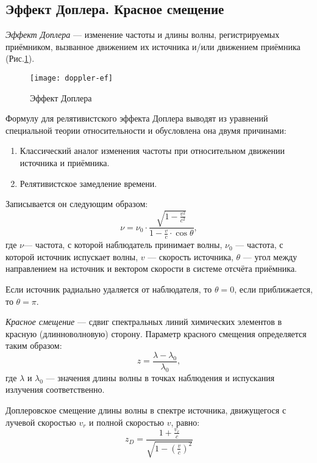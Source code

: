 \subsection{Эффект Доплера. Красное смещение} 
\textit{Эффект Доплера} --- изменение частоты и длины волны, регистрируемых  приёмником, вызванное движением их источника и/или движением приёмника (Рис.\ref{doppler-ef}).

\begin{figure}[h!]
\begin{center}
\texttt{[image: doppler-ef]}
\caption{Эффект Доплера}\label{doppler-ef}
\end{center}
\end{figure}

Формулу для релятивистского эффекта Доплера выводят из уравнений  специальной теории относительности и обусловлена она двумя причинами:
\begin{enumerate}
\item Классический аналог изменения частоты при относительном движении источника и приёмника.
\item Релятивистское замедление времени.
\end{enumerate}

Записывается он следующим образом:
\begin{equation}
\nu=\nu_0\cdot\frac{\sqrt{1-\frac{v^2}{c^2}}}{1-\frac{v}{c}\cdot\cos\theta},
\end{equation}
где $\nu$--- частота, с которой наблюдатель принимает волны, $\nu_0$ --- частота, с которой источник испускает волны, $v$ --- скорость источника, $\theta$ --- угол между направлением на источник и вектором скорости в системе отсчёта приёмника. 

Если источник радиально удаляется от наблюдателя, то $\theta =0$, если приближается, то $\theta =\pi$.

\textit{Красное смещение} --- сдвиг спектральных линий химических элементов в красную (длинноволновую) сторону. Параметр красного смещения определяется таким образом:
\begin{equation}
z=\frac{\lambda-\lambda_0}{\lambda_0},
\end{equation}
где $\lambda$ и $\lambda _{0}$ --- значения длины волны в точках наблюдения и испускания излучения соответственно.

Доплеровское смещение длины волны в спектре источника, движущегося с лучевой скоростью $v_{r}$ и полной скоростью $v$, равно:
\begin{equation}
z_D=\frac{1+\frac{v_r}{c}}{\sqrt{1-\left(\frac{v}{c}\right)^2}}
\end{equation}

